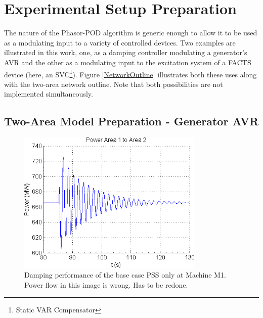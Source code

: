 \documentclass[journal]{IEEEtran}
\begin{document}
\section{Experimental Setup Preparation}\label{SetupPreparation}

The nature of the Phasor-POD algorithm is generic enough to allow it to be used as a modulating input to a variety of controlled devices. Two examples are illustrated in this work, one, as a damping controller modulating a generator\rq{s} AVR and the other as a modulating input to the excitation system of a FACTS device (here, an SVC\footnote{Static VAR Compensator}). Figure \ref{NetworkOutline} illustrates both these uses along with the two-area network outline. Note that both possibilities are not implemented simultaneously.
\vspace{-0.5em}
\subsection{Two-Area Model Preparation - Generator AVR}

\begin{figure}[!t]
\centering
\includegraphics[width=3.5in]{PSS_degraded_performance.png}
\caption{Damping performance of the base case PSS only at Machine M1. Power flow in this image is wrong. Has to be redone.}
\label{PSS_Degrade}
\end{figure}
\end{document}
